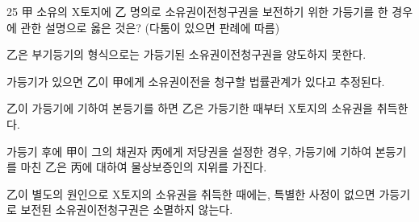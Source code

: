 \begin{question}{25}
甲 소유의 X토지에 乙 명의로 소유권이전청구권을 보전하기 위한 가등기를 한 경우에 관한 설명으로 옳은 것은? (다툼이 있으면 판례에 따름)
\begin{choices}
  \item 乙은 부기등기의 형식으로는 가등기된 소유권이전청구권을 양도하지 못한다.
  \item 가등기가 있으면 乙이 甲에게 소유권이전을 청구할 법률관계가 있다고 추정된다.
  \item 乙이 가등기에 기하여 본등기를 하면 乙은 가등기한 때부터 X토지의 소유권을 취득한다.
  \item 가등기 후에 甲이 그의 채권자 丙에게 저당권을 설정한 경우, 가등기에 기하여 본등기를 마친 乙은 丙에 대하여 물상보증인의 지위를 가진다.
  \item 乙이 별도의 원인으로 X토지의 소유권을 취득한 때에는, 특별한 사정이 없으면 가등기로 보전된 소유권이전청구권은 소멸하지 않는다.
\end{choices}
\end{question}
